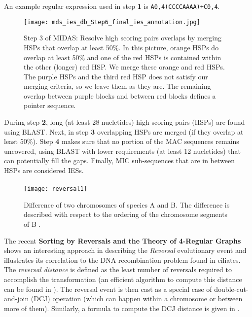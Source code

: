 An example regular expression used in step \textbf{1} is \texttt{A{0,4}(CCCCAAAA)+C{0,4}}.
\begin{figure}[h]
  \centering
    \texttt{[image: mds\_ies\_db\_Step6\_final\_ies\_annotation.jpg]}
  \caption{Step 3 of MIDAS: Resolve high scoring pairs overlaps by merging HSPs that overlap at least 50\%. In this picture, orange HSPs do overlap at least 50\% and one of the red HSPs is contained within the other (longer) red HSP. We merge these orange and red HSPs. The purple HSPs and the third red HSP does not satisfy our merging criteria, so we leave them as they are. The remaining overlap between purple blocks and between red blocks defines a pointer sequence. \cite{midas}}

\end{figure}

During step \textbf{2}, long (at least 28 nucletides) high scoring pairs (HSPs) are found using BLAST. Next, in step \textbf{3} overlapping HSPs are merged (if they overlap at least 50\%).
Step \textbf{4} makes sure that no portion of the MAC sequences remains uncovered, using BLAST with lower requirements (at least 12 nucletides) that can potentially fill the gaps.
Finally, MIC sub-sequences that are in between HSPs are considered IESs.

\paragraph{}
\begin{figure}[h]

  \centering
    \texttt{[image: reversal1]}

  \caption{ Difference of two chromosomes of species A and B. The difference is described with respect to the ordering of the chromosome segments of B \cite{DBLP:journals/corr/Brijder17}.}
  \label{fig:reversal1}

\end{figure}
The recent \textbf{Sorting by Reversals and the Theory of 4-Regular Graphs} \cite{DBLP:journals/corr/Brijder17} shows an interesting approach in describing the \textit{Reversal} evolutionary event and illustrates its correlation to the DNA recombination problem found in ciliates. The \textit{reversal distance} is defined as the least number of reversals required to accomplish the transformation (an efficient algorithm to compute this distance can be found in \cite{Hannenhalli}). The reversal event is then cast as a special case of double-cut-and-join (DCJ) operation (which can happen within a chromosome or between more of them). Similarly, a formula to compute the DCJ distance is given in \cite{Bergeron2006}.


